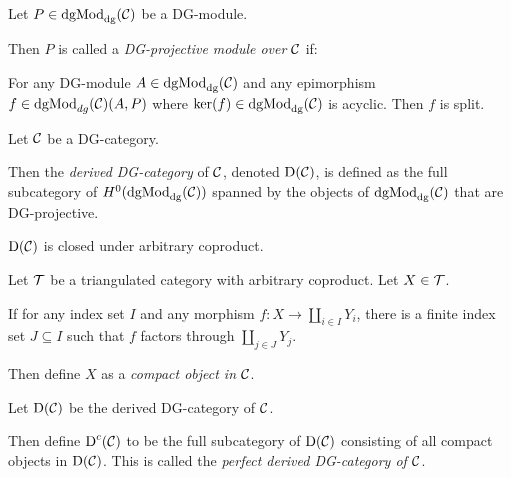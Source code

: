 \begin{definition}
    Let \( P \in \operatorname{dgMod}_{\operatorname{dg}}({\mathcal{C}}) \) be a DG-module.

    Then \( P \) is called a \emph{DG-projective module over \( {\mathcal{C}} \)} if:
    
    For any DG-module \( A \in \operatorname{dgMod}_{\operatorname{dg}}({\mathcal{C}}) \) and any epimorphism \( f \in \operatorname{dgMod}_{dg}({\mathcal{C}})(A, P) \) where \( \ker(f) \in \operatorname{dgMod}_{\operatorname{dg}}({\mathcal{C}}) \) is acyclic. Then \( f \) is split.
\end{definition}

\begin{definition}
    Let \( {\mathcal{C}} \) be a DG-category.

    Then the \emph{derived DG-category} of \( {\mathcal{C}} \), denoted \( \operatorname{D}({\mathcal{C}}) \), is defined as the full subcategory of \( H^0(\operatorname{dgMod}_{\operatorname{dg}}({\mathcal{C}})) \) spanned by the objects of \( \operatorname{dgMod}_{\operatorname{dg}}({\mathcal{C}}) \) that are DG-projective.
\end{definition}

\begin{proposition}
    \( \operatorname{D}({\mathcal{C}}) \) is closed under arbitrary coproduct.
\end{proposition}

\begin{definition}
    Let \( {\mathcal{T}} \) be a triangulated category with arbitrary coproduct. Let \( X \in {\mathcal{T}} \).
    
    If for any index set \( I \) and any morphism \( f: X \to \coprod_{i \in I} Y_i \), there is a finite index set \( J \subseteq I \) such that \( f \) factors through \( \coprod_{j \in J} Y_j \).
    
    Then define \( X \) as a \emph{compact object in \( {\mathcal{C}} \)}.
\end{definition}

\begin{definition}
    Let \( \operatorname{D}({\mathcal{C}}) \) be the derived DG-category of \( {\mathcal{C}} \).

    Then define \( \operatorname{D}^c({\mathcal{C}}) \) to be the full subcategory of \( \operatorname{D}({\mathcal{C}}) \) consisting of all compact objects in \( \operatorname{D}({\mathcal{C}}) \). This is called the \emph{perfect derived DG-category of \( {\mathcal{C}} \)}.
\end{definition}


